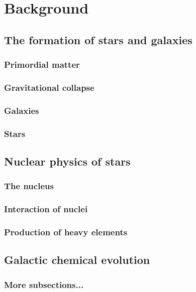 \section{Background}

\subsection{The formation of stars and galaxies}
\subsubsection{Primordial matter}
\subsubsection{Gravitational collapse}
\subsubsection{Galaxies}
\subsubsection{Stars}
\subsection{Nuclear physics of stars}
\subsubsection{The nucleus}
\subsubsection{Interaction of nuclei}
\subsubsection{Production of heavy elements}
\subsection{Galactic chemical evolution}
\subsubsection{More subsections...}
